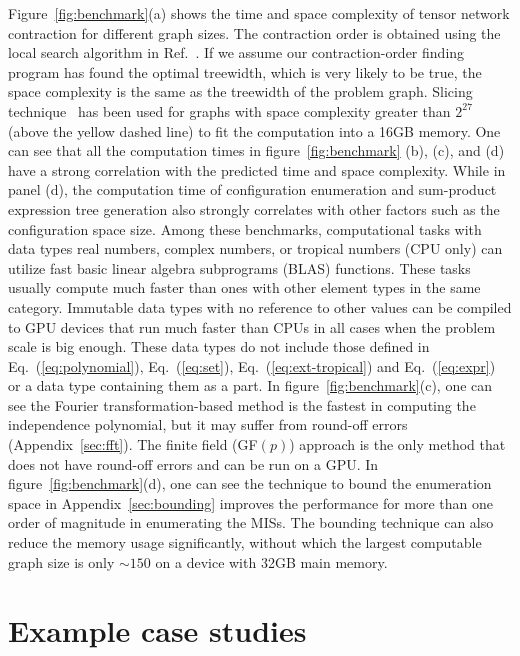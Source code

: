 \documentclass[onefignum, onetabnum]{siamart190516}
\newcommand{\<}{\langle}
\renewcommand{\>}{\rangle}
\newcommand{\Eq}[1]{Eq.~(\ref{#1})}
\newcommand{\App}[1]{Appendix~\ref{#1}}
\newcounter{example}
\begin{document}
Figure~\ref{fig:benchmark}(a) shows the time and space complexity of tensor network contraction for different graph sizes.
The contraction order is obtained using the local search algorithm in Ref.~\cite{Kalachev2021}.
If we assume our contraction-order finding program has found the optimal treewidth, which is very likely to be true, the space complexity is the same as the treewidth of the problem graph.
Slicing technique~\cite{Kalachev2021} has been used for graphs with space complexity greater than $2^{27}$ (above the yellow dashed line) to fit the computation into a 16GB memory.
One can see that all the computation times in figure~\ref{fig:benchmark} (b), (c), and (d) have a strong correlation with the predicted time and space complexity.
While in panel (d), the computation time of configuration enumeration and sum-product expression tree generation also strongly correlates with other factors such as the configuration space size.
Among these benchmarks, computational tasks with data types real numbers, complex numbers, or tropical numbers (CPU only) can utilize fast basic linear algebra subprograms (BLAS) functions.
These tasks usually compute much faster than ones with other element types in the same category.
Immutable data types with no reference to other values can be compiled to GPU devices that run much faster than CPUs in all cases when the problem scale is big enough.
These data types do not include those defined in \Eq{eq:polynomial}, \Eq{eq:set}, \Eq{eq:ext-tropical} and \Eq{eq:expr} or a data type containing them as a part.
In figure~\ref{fig:benchmark}(c), one can see the Fourier transformation-based method is the fastest in computing the independence polynomial,
but it may suffer from round-off errors (\App{sec:fft}). The finite field (GF$(p)$) approach is the only method that does not have round-off errors and can be run on a GPU.
In figure~\ref{fig:benchmark}(d), one can see the technique to bound the enumeration space in \App{sec:bounding} improves the performance for more than one order of magnitude in enumerating the MISs.
The bounding technique can also reduce the memory usage significantly, without which the largest computable graph size is only $\sim150$ on a device with 32GB main memory.

\section{Example case studies} \label{sec:examples}
\end{document}
